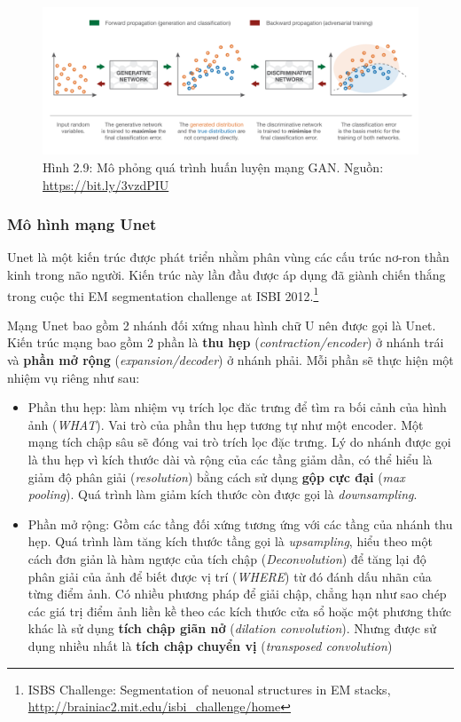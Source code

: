 \documentclass[a4paper]{article}
\begin{document}
\begin{figure}[h!]
\centering
\includegraphics[width=16.5cm]{images/2_72.png}
\caption{Hình 2.9: Mô phỏng quá trình huấn luyện mạng GAN. Nguồn: \href{https://bit.ly/3vzdPIU}{https://bit.ly/3vzdPIU}}
\end{figure}

\subsubsection{Mô hình mạng Unet}
Unet là một kiến trúc được phát triển nhằm phân vùng các cấu trúc nơ-ron thần kinh trong não người. Kiến trúc này lần đầu được áp dụng đã giành chiến thắng trong cuộc thi EM segmentation challenge at ISBI 2012.\footnote{ISBS Challenge: Segmentation of neuonal structures in EM stacks, \href{http://brainiac2.mit.edu/isbi\_challenge/home}{http://brainiac2.mit.edu/isbi\_challenge/home}}

\noindent
Mạng Unet bao gồm 2 nhánh đối xứng nhau hình chữ U nên được gọi là Unet. Kiến trúc mạng bao gồm 2 phần là \textbf{thu hẹp} (\textit{contraction/encoder}) ở nhánh trái và \textbf{phần mở rộng} (\textit{expansion/decoder}) ở nhánh phải. Mỗi phần sẽ thực hiện một nhiệm vụ riêng như sau:

\begin{itemize}
    \item Phần thu hẹp: làm nhiệm vụ trích lọc đăc trưng để tìm ra bối cảnh của hình ảnh (\textit{WHAT}). Vai trò của phần thu hẹp tương tự như một encoder. Một mạng tích chập sâu sẽ đóng vai trò trích lọc đặc trưng. Lý do nhánh được gọi là thu hẹp vì kích thước dài và rộng của các tầng giảm dần, có thể hiểu là giảm độ phân giải (\textit{resolution}) bằng cách sử dụng \textbf{gộp cực đại} (\textit{max pooling}). Quá trình làm giảm kích thước còn được gọi là \textit{downsampling}.
    
    \item Phần mở rộng: Gồm các tầng đối xứng tương ứng với các tầng của nhánh thu hẹp. Quá trình làm tăng kích thước tầng gọi là \textit{upsampling}, hiểu theo một cách đơn giản là hàm ngược của tích chập (\textit{Deconvolution}) để tăng lại độ phân giải của ảnh để biết được vị trí (\textit{WHERE}) từ đó đánh dấu nhãn của từng điểm ảnh. Có nhiều phương pháp để giải chập, chẳng hạn như sao chép các giá trị điểm ảnh liền kề theo các kích thước cửa sổ hoặc một phương thức khác là sử dụng \textbf{tích chập giãn nở} (\textit{dilation convolution}). Nhưng được sử dụng nhiều nhất là \textbf{tích chập chuyển vị} (\textit{transposed convolution})
\end{itemize}
\end{document}

